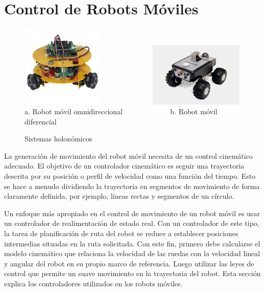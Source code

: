 \section{Control de Robots M\'oviles}
\begin{figure}%
  \centering \footnotesize
  \includegraphics[width=0.35\textwidth]{images/omnidirecional.jpg}~~~~~~~~~~~~~~
  \includegraphics[width=0.40\textwidth]{images/RM_noHolonomic.jpg}
  \\ a. Robot móvil omnidireccional $\qquad\qquad\qquad$  b. Robot móvil diferencial
  \captionsetup{font=footnotesize}
  \caption{Sistemas holonómicos} 
  \label{f:sLocomocion}
\end{figure}
La generaci\'on de movimiento del robot m\'ovil necesita de un control cinem\'atico 
adecuado. El objetivo de un controlador cinem\'atico es seguir una trayectoria descrita 
por su posici\'on o perfil de velocidad como una funci\'on del tiempo. Esto se hace 
a menudo dividiendo la trayectoria en segmentos de movimiento de forma claramente 
definida, por ejemplo, l\'ineas rectas y segmentos de un c\'irculo.

Un enfoque m\'as apropiado en el control de movimiento de un robot m\'ovil es usar 
un controlador de realimentaci\'on de estado real. Con un controlador de este tipo, 
la tarea de planificaci\'on de ruta del robot se reduce a establecer posiciones 
intermedias situadas en la ruta solicitada. Con este fin, primero debe calcularse 
el modelo cinem\'atico que relaciona la velocidad de las ruedas con la velocidad 
lineal y angular del robot en su propio marco de referencia. Luego utilizar las 
leyes de control que permite un suave movimiento en la trayectoria del robot. Esta 
secci\'on explica los controladores utilizados en los robots m\'oviles.

